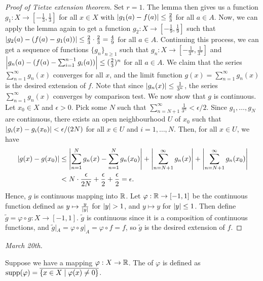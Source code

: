 \begin{proof}[Proof of Tietze extension theorem]
    Set $r = 1$. The lemma then gives us a function $g_{1} : X \to [-\frac{1}{3},\frac{1}{3}]$ for all $x \in X$ with $\left| g_{1}(a)-f(a) \right| \leq \frac{2}{3}$ for all $a \in A$. Now, we can apply the lemma again to get a function $g_{2} : X \to [-\frac{1}{9},\frac{1}{9}]$ such that $\left| g_{2}(a)-(f(a)-g_{1}(a)) \right| \leq \frac{2}{3} \cdot \frac{2}{3} = \frac{4}{9}$ for all $a \in A$. Continuing this process, we can get a sequence of functions $\{g_{n}\}_{n \geq 1}$ such that $g_{n} : X \to [-\frac{1}{3^{n}},\frac{1}{3^{n}}]$ and $\left| g_{n}(a) - (f(a) - \sum_{i=1}^{n-1} g_{i}(a)) \right| \leq (\frac{2}{3})^{n}$ for all $a \in A$. We claim that the series $\sum_{n=1}^{\infty} g_{n}(x)$ converges for all $x$, and the limit function $g(x) = \sum_{n=1}^{\infty} g_{n}(x)$ is the desired extension of $f$. Note that since $\left| g_{n}(x) \right| \leq \frac{1}{3^{n}}$, the series $\sum_{n=1}^{\infty} g_{n}(x)$ converges by comparison test. We now show that $g$ is continuous. Let $x_{0} \in X$ and $\epsilon > 0$. Pick some $N$ such that $\sum_{n=N+1}^{\infty} \frac{1}{3^{n}} < \epsilon/2$. Since $g_{1},\ldots,g_{N}$ are continuous, there exists an open neighbourhood $U$ of $x_{0}$ such that $\left| g_{i}(x) - g_{i}(x_{0}) \right| < \epsilon/(2N)$ for all $x \in U$ and $i = 1,\ldots,N$. Then, for all $x \in U$, we have
    \begin{align}
        \left| g(x) - g(x_{0}) \right| &\leq \left| \sum_{n=1}^{N} g_{n}(x) - \sum_{n=1}^{N} g_{n}(x_{0}) \right| + \left| \sum_{n=N+1}^{\infty} g_{n}(x) \right| + \left| \sum_{n=N+1}^{\infty} g_{n}(x_{0}) \right| \\
        &< N \cdot \frac{\epsilon}{2N} + \frac{\epsilon}{2} + \frac{\epsilon}{2} = \epsilon.
    \end{align}
    Hence, $g$ is continuous mapping into $\mathbb{R}$. Let $\varphi:\mathbb{R} \to [-1,1]$ be the continuous function defined as $y \mapsto \frac{y}{\left| y \right|}$ for $\left| y \right| > 1$, and $y \mapsto y$ for $\left| y \right| \leq 1$. Then define $\tilde{g} = \varphi \circ g :X \to [-1,1]$. $\tilde{g}$ is continuous since it is a composition of continuous functions, and $\tilde{g}|_{A} = \varphi \circ g|_{A} = \varphi \circ f = f$, so $\tilde{g}$ is the desired extension of $f$.
\end{proof}

\textit{March 20th.}

\begin{definition}
    Suppose we have a mapping $\varphi : X \to \mathbb{R}$. The  of $\varphi$ is defined as $\operatorname{supp}(\varphi) = \overline{\{x \in X \mid \varphi(x) \neq 0\}}$.
\end{definition}


